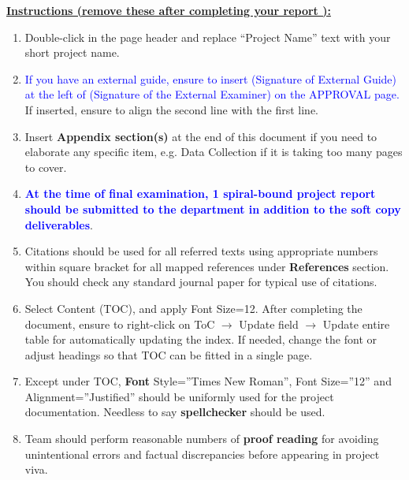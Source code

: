 \thispagestyle{plain}
\color{red}
{\large \bf \underline {Instructions (remove these after completing your report ):}}
\color{black}
\begin{enumerate}[label=\roman*.]
\item 	Double-click in the page header and replace “Project Name” text with your short project name.

\item \textcolor{blue} {
{If you have an external guide, ensure to insert (Signature of External Guide) at the left of (Signature of the External Examiner) on the APPROVAL page.}} If inserted, ensure to align the second line with the first line.

\item Insert \textbf{Appendix section(s)} at the end of this document if you need to elaborate any specific item, e.g. Data Collection if it is taking too many pages to cover.

\item 	\textcolor{blue}{\textbf{At the time of final examination, 1 spiral-bound project report should be submitted to the department in addition to the soft copy deliverables}}.

\item Citations should be used for all referred texts using appropriate numbers within square bracket for all mapped references under \textbf{References} section. You should check any standard journal paper for typical use of citations. 

\item 	Select Content (TOC), and apply Font Size=12. After completing the document, ensure to right-click on ToC $\rightarrow$ Update field  $\rightarrow$ Update entire table for automatically updating the index. If needed, change the font or adjust headings so that TOC can be fitted in a single page.

\item	Except under TOC, \textbf{Font} Style=”Times New Roman”, Font Size=”12” and Alignment=”Justified” should be uniformly used for the project documentation. Needless to say \textbf{spellchecker} should be used. 

\item Team should perform reasonable numbers of \textbf{proof reading} for avoiding unintentional errors and factual discrepancies before appearing in project viva.


\end{enumerate}
